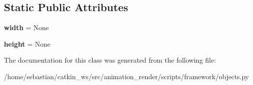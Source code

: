 \subsection*{Static Public Attributes}
\begin{DoxyCompactItemize}
\item 
{\bfseries width} = None\hypertarget{classobjects_1_1Plane_adceffe68e570c2e4408ac5cde081291b}{}\label{classobjects_1_1Plane_adceffe68e570c2e4408ac5cde081291b}

\item 
{\bfseries height} = None\hypertarget{classobjects_1_1Plane_a47e939fe066057224263d2e8530f9438}{}\label{classobjects_1_1Plane_a47e939fe066057224263d2e8530f9438}

\end{DoxyCompactItemize}


The documentation for this class was generated from the following file\+:\begin{DoxyCompactItemize}
\item 
/home/sebastian/catkin\+\_\+ws/src/animation\+\_\+render/scripts/framework/objects.\+py\end{DoxyCompactItemize}
